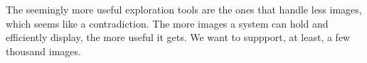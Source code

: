 The seemingly more useful exploration tools are the ones that handle less images, which seems like a contradiction. The more images a system can hold and efficiently display, the more useful it gets. We want to suppport, at least, a few thousand images. 

